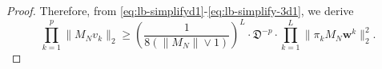 \documentclass{amsart}
\numberwithin{equation}{section}
\def\corAB{}
\begin{document}
\begin{proof}
\corAB{Therefore, from \eqref{eq:lb-simplifyd1}-\eqref{eq:lb-simplify-3d1}, we derive
\[
\prod_{k=1}^p   \|{M}_{N} v_k\|_2 \ge \left(\frac{1}{8 (\|M_N\| \vee 1) }\right)^L \cdot \mathfrak{D}^{-p} \cdot \prod_{k=1}^L \|\pi_k M_N {\bm w}^k\|_2^2.
\]}


\end{proof}
\end{document}
